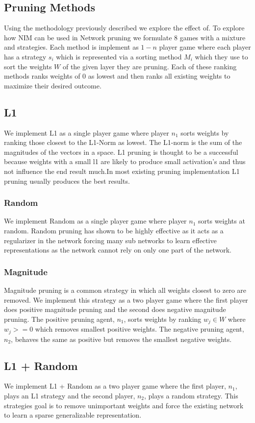 \documentclass[11pt]{article}
\begin{document}
\subsection{Pruning Methods}
Using the methodology previously described we explore the effect of. To explore how NIM can be used in Network pruning we formulate 8 games with a mixture and strategies. Each method is implement as $1-n$ player game where each player has a strategy $s_i$ which is represented via a sorting method $M_i$ which they use to sort the weights $W$ of the given layer they are pruning. Each of these ranking methods ranks weights of 0 as lowest and then ranks all existing weights to maximize their desired outcome.
\subsection{L1}
We implement L1 as a single player game where player $n_1$ sorts weights by ranking those closest to the L1-Norm as lowest. The L1-norm is the sum of the magnitudes of the vectors in a space. L1 pruning is thought to be a successful because weights with a small l1 are likely to produce small activation's and thus not influence the end result much.In most existing pruning implementation L1 pruning usually produces the best results. 
\subsubsection{Random}
We implement Random as a single player game where player $n_1$ sorts weights at random. Random pruning has shown to be highly effective as it acts as a regularizer in the network forcing many sub networks to learn effective representations as the network cannot rely on only one part of the network.
\subsubsection{Magnitude}
Magnitude pruning is a common strategy in which all weights closest to zero are removed. We implement this strategy as a two player game where the first player does positive magnitude pruning and the second does negative magnitude pruning. The positive pruning agent, $n_1$, sorts weights by ranking $w_j \in W$ where $w_j >= 0$ which removes smallest positive weights. The negative pruning agent, $n_2$, behaves the same as positive but removes the smallest negative weights.
\subsection{L1 + Random}
We implement L1 + Random as a two player game where the first player, $n_1$, plays an L1 strategy and the second player, $n_2$, plays a random strategy. This strategies goal is to remove unimportant weights and force the existing network to learn a sparse generalizable representation.
\end{document}
